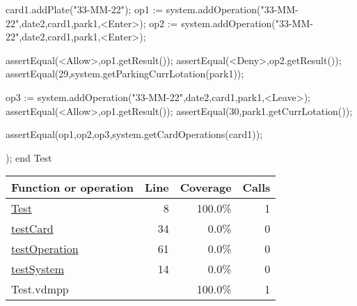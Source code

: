 \begin{vdmpp}[breaklines=true]
  card1.addPlate("33-MM-22");
  op1 := system.addOperation("33-MM-22",date2,card1,park1,<Enter>);
  op2 := system.addOperation("33-MM-22",date2,card1,park1,<Enter>);
  
  assertEqual(<Allow>,op1.getResult());
  assertEqual(<Deny>,op2.getResult());
  assertEqual(29,system.getParkingCurrLotation(park1));
  
  op3 := system.addOperation("33-MM-22",date2,card1,park1,<Leave>);
  assertEqual(<Allow>,op1.getResult());
  assertEqual(30,park1.getCurrLotation());
  
  assertEqual({op1,op2,op3},system.getCardOperations(card1));
  
 );
end Test
\end{vdmpp}
\bigskip
\begin{longtable}{|l|r|r|r|}
\hline
Function or operation & Line & Coverage & Calls \\
\hline
\hline
\hyperref[Test:8]{Test} & 8&100.0\% & 1 \\
\hline
\hyperref[testCard:34]{testCard} & 34&0.0\% & 0 \\
\hline
\hyperref[testOperation:61]{testOperation} & 61&0.0\% & 0 \\
\hline
\hyperref[testSystem:14]{testSystem} & 14&0.0\% & 0 \\
\hline
\hline
Test.vdmpp & & 100.0\% & 1 \\
\hline
\end{longtable}

